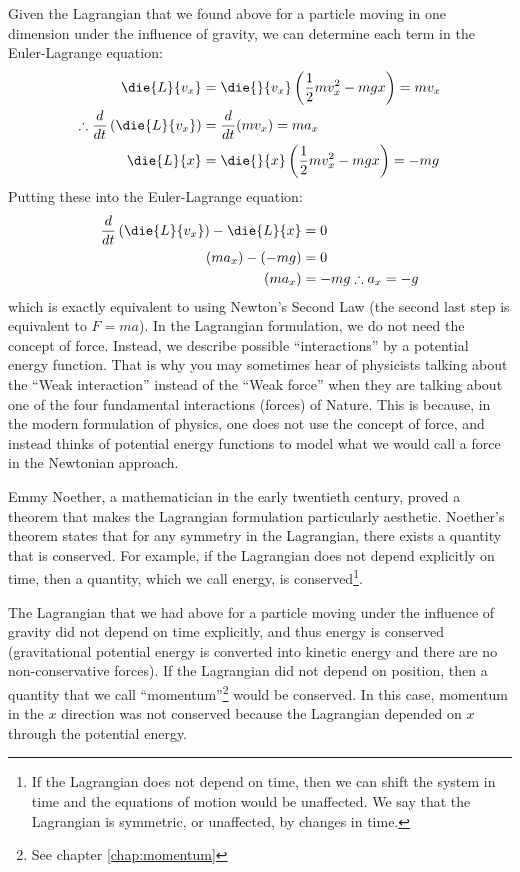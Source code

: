 Given the Lagrangian that we found above for a particle moving in one dimension under the influence of gravity, we can determine each term in the Euler-Lagrange equation:
\begin{align*}
\die{L}{v_x} &= \die{}{v_x}\left(\frac{1}{2}mv_x^2 - mgx \right)=mv_x\\
\therefore\frac{d}{dt}\left(\die{L}{v_x}\right) &= \frac{d}{dt} (mv_x) = ma_x\\
\die{L}{x}&= \die{}{x}\left(\frac{1}{2}mv_x^2 - mgx\right) = -mg\\
\end{align*}
Putting these into the Euler-Lagrange equation:
\begin{align*}
\frac{d}{dt}\left(\die{L}{v_x}\right)-\die{L}{x} &= 0\\
(ma_x) - (-mg) &=0\\
(ma_x)&=-mg
\therefore a_x = -g
\end{align*}
which is exactly equivalent to using Newton's Second Law (the second last step is equivalent to $F=ma$). In the Lagrangian formulation, we do not need the concept of force. Instead, we describe possible ``interactions'' by a potential energy function. That is why you may sometimes hear of physicists talking about the ``Weak interaction'' instead of the ``Weak force'' when they are talking about one of the four fundamental interactions (forces) of Nature. This is because, in the modern formulation of physics, one does not use the concept of force, and instead thinks of potential energy functions to model what we would call a force in the Newtonian approach.

Emmy Noether, a mathematician in the early twentieth century, proved a theorem that makes the Lagrangian formulation particularly aesthetic.%
Noether's theorem states that for any symmetry in the Lagrangian, there exists a quantity that is conserved. For example, if the Lagrangian does not depend explicitly on time, then a quantity, which we call energy, is conserved\footnote{If the Lagrangian does not depend on time, then we can shift the system in time and the equations of motion would be unaffected. We say that the Lagrangian is symmetric, or unaffected, by changes in time.}. 

The Lagrangian that we had above for a particle moving under the influence of gravity did not depend on time explicitly, and thus energy is conserved (gravitational potential energy is converted into kinetic energy and there are no non-conservative forces). If the Lagrangian did not depend on position, then a quantity that we call ``momentum''\footnote{See chapter \ref{chap:momentum}} would be conserved. In this case, momentum in the $x$ direction was not conserved because the Lagrangian depended on $x$ through the potential energy. 

